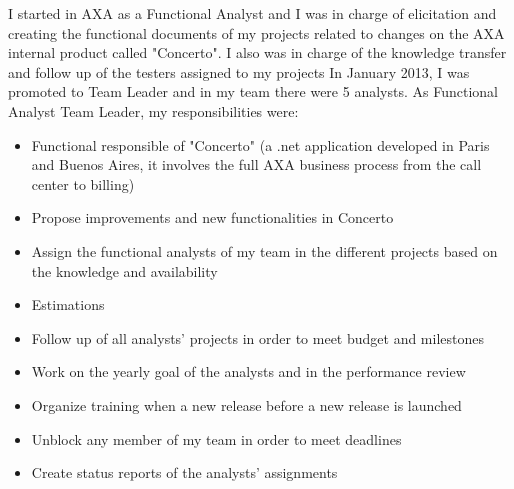 \documentclass[11pt,a4paper,sans]{moderncv}
\begin{document}
{
I started in AXA as a Functional Analyst and I was in charge of elicitation and creating the functional documents of my projects related to changes on the AXA internal product called "Concerto". I also was in charge of the knowledge transfer and follow up of the testers assigned to my projects
\newline{}
In January 2013, I was promoted to Team Leader and in my team there were 5 analysts.
\newline{}
}
{ As Functional Analyst Team Leader, my responsibilities were:
}
\begin{itemize}
  \item Functional responsible of "Concerto" (a .net application developed in Paris and Buenos Aires, it involves the full AXA business process from the call center to billing) 
  \item Propose improvements and new functionalities in Concerto 
  \item Assign the functional analysts of my team in the different projects based on the knowledge and availability
  \item Estimations
  \item Follow up of all analysts' projects in order to meet budget and milestones
  \item Work on the yearly goal of the analysts and in the performance review
  \item Organize training when a new release before a new release is launched
  \item Unblock any member of my team in order to meet deadlines
  \item Create status reports of the analysts' assignments
\newline{}
\end{itemize}




\end{document}
